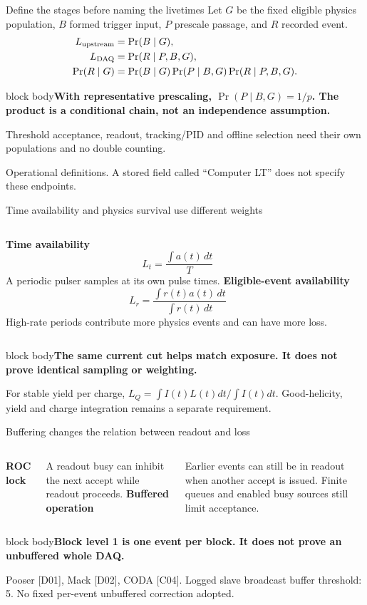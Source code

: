 \documentclass[aspectratio=169,11pt]{beamer}
\newcommand{\source}[1]{\par\vfill{\scriptsize\color{muted}#1\par}}
\newcommand{\takeaway}[1]{\begin{beamercolorbox}[sep=2.5mm,wd=\linewidth]{block body}\textbf{#1}\end{beamercolorbox}}
\begin{document}
\begin{frame}{Define the stages before naming the livetimes}
\small Let $G$ be the fixed eligible physics population, $B$ formed trigger input,
$P$ prescale passage, and $R$ recorded event.
\begin{align*}
L_{\rm upstream}&=\Pr(B\mid G),\\
L_{\rm DAQ}&=\Pr(R\mid P,B,G),\\
\Pr(R\mid G)&=\Pr(B\mid G)\Pr(P\mid B,G)\Pr(R\mid P,B,G).
\end{align*}
\takeaway{With representative prescaling, $\Pr(P\mid B,G)=1/p$. The product is a conditional chain, not an independence assumption.}
\vspace{2mm}\small Threshold acceptance, readout, tracking/PID and offline selection need their own populations and no double counting.
\source{Operational definitions. A stored field called ``Computer LT'' does not specify these endpoints.}
\end{frame}

\begin{frame}{Time availability and physics survival use different weights}
\begin{columns}[T]
\textbf{Time availability}
\[L_t=\frac{\int a(t)\,dt}{T}\]
A periodic pulser samples at its own pulse times.
\textbf{Eligible-event availability}
\[L_r=\frac{\int r(t)a(t)\,dt}{\int r(t)\,dt}\]
High-rate periods contribute more physics events and can have more loss.
\end{columns}\vspace{5mm}
\takeaway{The same current cut helps match exposure. It does not prove identical sampling or weighting.}
\source{For stable yield per charge, $L_Q=\int I(t)L(t)dt/\int I(t)dt$. Good-helicity, yield and charge integration remains a separate requirement.}
\end{frame}

\begin{frame}{Buffering changes the relation between readout and loss}
\begin{columns}[T]
\textbf{ROC lock}\par\vspace{3mm}
A readout busy can inhibit the next accept while readout proceeds.
\textbf{Buffered operation}\par\vspace{3mm}
Earlier events can still be in readout when another accept is issued.
Finite queues and enabled busy sources still limit acceptance.
\end{columns}\vspace{6mm}
\takeaway{Block level 1 is one event per block. It does not prove an unbuffered whole DAQ.}
\source{Pooser [D01], Mack [D02], CODA [C04]. Logged slave broadcast buffer threshold: 5. No fixed per-event unbuffered correction adopted.}
\end{frame}
\end{document}
